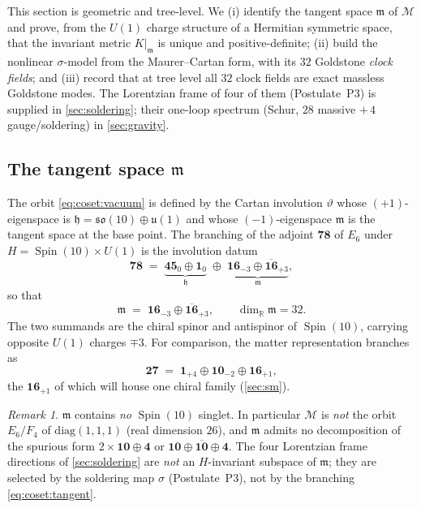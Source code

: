 \documentclass[11pt]{article}
\theoremstyle{plain}
\theoremstyle{definition}
\theoremstyle{remark}
\newtheorem{remark}[theorem]{Remark}
\newcommand{\Spin}{\operatorname{Spin}}
\begin{document}
This section is geometric and tree-level. We (i) identify the tangent space
$\mathfrak m$ of $\mathcal M$ and prove, from the $U(1)$ charge structure of a
Hermitian symmetric space, that the invariant metric $K|_{\mathfrak m}$ is unique
and positive-definite; (ii) build the nonlinear $\sigma$-model from the
Maurer--Cartan form, with its $32$ Goldstone \emph{clock fields}; and (iii)
record that at tree level all $32$ clock fields are exact massless Goldstone
modes. The Lorentzian frame of four of them (Postulate~P3) is supplied in
\autoref{sec:soldering}; their one-loop spectrum (Schur, $28$ massive $+\,4$
gauge/soldering) in \autoref{sec:gravity}.

\subsection{The tangent space \texorpdfstring{$\mathfrak m$}{m}}
\label{sec:coset:tangent}

The orbit \eqref{eq:coset:vacuum} is defined by the Cartan involution
$\vartheta$ whose $(+1)$-eigenspace is $\mathfrak h = \mathfrak{so}(10)\oplus
\mathfrak u(1)$ and whose $(-1)$-eigenspace $\mathfrak m$ is the tangent space at
the base point. The branching of the adjoint $\mathbf{78}$ of $E_{6}$ under
$H = \Spin(10)\times U(1)$ is the involution datum
\begin{equation}\label{eq:coset:adjoint}
  \mathbf{78}
  \;=\; \underbrace{\mathbf{45}_{0}\oplus\mathbf 1_{0}}_{\mathfrak h}
       \;\oplus\;
        \underbrace{\mathbf{16}_{-3}\oplus\overline{\mathbf{16}}_{+3}}_{\mathfrak m},
\end{equation}
so that
\begin{equation}\label{eq:coset:tangent}
  \mathfrak m \;=\; \mathbf{16}_{-3}\oplus\overline{\mathbf{16}}_{+3},
  \qquad \dim_{\mathbb R}\mathfrak m = 32 .
\end{equation}
The two summands are the chiral spinor and antispinor of $\Spin(10)$, carrying
opposite $U(1)$ charges $\mp 3$. For comparison, the matter representation
branches as
\begin{equation}\label{eq:coset:fund}
  \mathbf{27} \;=\; \mathbf 1_{+4}\oplus\mathbf{10}_{-2}\oplus\mathbf{16}_{+1},
\end{equation}
the $\mathbf{16}_{+1}$ of which will house one chiral family
(\autoref{sec:sm}).

\begin{remark}\label{rem:coset:nosinglet}
$\mathfrak m$ contains \emph{no} $\Spin(10)$ singlet. In particular $\mathcal M$
is \emph{not} the orbit $E_{6}/F_{4}$ of $\mathrm{diag}(1,1,1)$ (real dimension
$26$), and $\mathfrak m$ admits no decomposition of the spurious form
$2\times\mathbf{10}\oplus\mathbf 4$ or $\mathbf{10}\oplus\overline{\mathbf{10}}
\oplus\mathbf 4$. The four Lorentzian frame directions of
\autoref{sec:soldering} are \emph{not} an $H$-invariant subspace of
$\mathfrak m$; they are selected by the soldering map $\sigma$ (Postulate~P3),
not by the branching \eqref{eq:coset:tangent}.
\end{remark}
\end{document}
